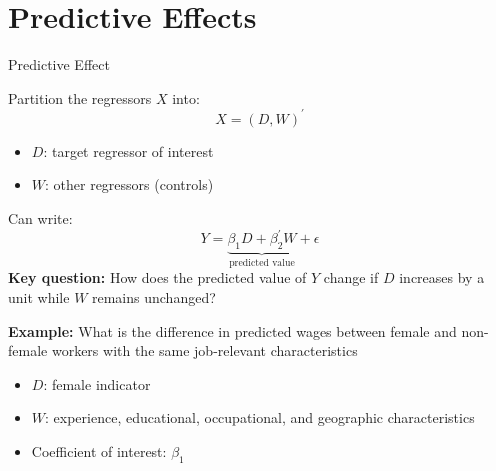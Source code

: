 \documentclass[compress, 8pt]{beamer}
\begin{document}
\section[Inference]{Predictive Effects}
\miniframesoff
\begin{frame}
    \tableofcontents[currentsection]
\end{frame}
\miniframeson

\begin{frame}{Predictive Effect}
    
    Partition the regressors $X$ into:
    \begin{equation*}
        X = (D, W)^\prime
    \end{equation*}
    \begin{itemize}
        \item $D$: target regressor of interest
        \item $W$: other regressors (controls)
    \end{itemize}
    Can write:
    \begin{equation*}
        Y = \underbrace{\beta_1 D + \beta_2^\prime W}_{\text{predicted value}} + \epsilon
    \end{equation*}
    \textbf{Key question:}  How does the predicted value of $Y$ change if $D$ increases by a unit while $W$ remains unchanged?

    \vspace{2ex} \textbf{Example:} What is the difference in predicted wages between female and non-female workers with the same job-relevant characteristics
    \begin{itemize}
        \item $D$: female indicator
        \item $W$: experience, educational, occupational, and geographic characteristics
        \item Coefficient of interest: $\beta_1$
    \end{itemize}

\end{frame}
\end{document}
